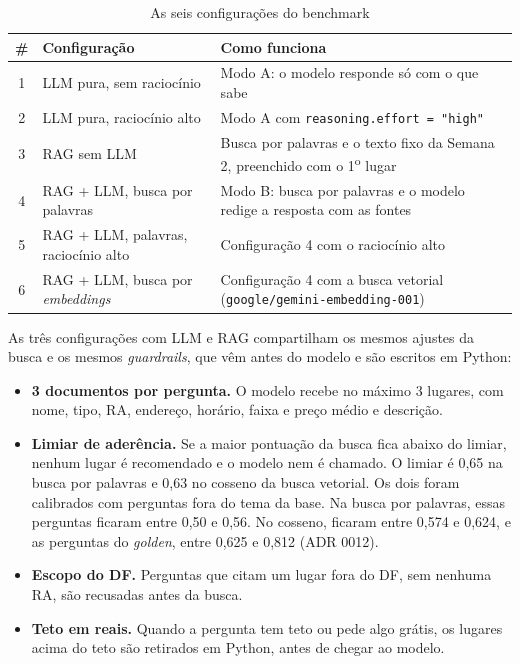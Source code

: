 \documentclass[11pt,a4paper]{article}
\newcommand{\fonte}{\vspace{0.1cm}\flushleft{\footnotesize{Fonte: elaborado pelos autores (2026).}}}
\newcommand{\codigo}[1]{\texttt{\small #1}}
\begin{document}
\begin{table}[!htbp]
\centering
\small
\renewcommand{\arraystretch}{1.03}
\caption{As seis configurações do benchmark}
\label{tab:configs}
\begin{tabularx}{\textwidth}{c p{5.6cm} L}
\toprule
\textbf{\#} & \textbf{Configuração} & \textbf{Como funciona} \\
 & LLM pura, sem raciocínio & Modo A: o modelo responde só com o que sabe \\
2 & LLM pura, raciocínio alto & Modo A com \codigo{reasoning.effort = "high"} \\
3 & RAG sem LLM & Busca por palavras e o texto fixo da Semana 2, preenchido com o 1\textsuperscript{o} lugar \\
4 & RAG + LLM, busca por palavras & Modo B: busca por palavras e o modelo redige a resposta com as fontes \\
5 & RAG + LLM, palavras, raciocínio alto & Configuração 4 com o raciocínio alto \\
6 & RAG + LLM, busca por \textit{embeddings} & Configuração 4 com a busca vetorial (\codigo{google/gemini-embedding-001}) \\
\bottomrule
\end{tabularx}
\fonte
\end{table}

As três configurações com LLM e RAG compartilham os mesmos ajustes da busca e os mesmos \textit{guardrails}, que vêm antes do modelo e são escritos em Python:

\begin{itemize}
\item \textbf{3 documentos por pergunta.} O modelo recebe no máximo 3 lugares, com nome, tipo, RA, endereço, horário, faixa e preço médio e descrição.
\item \textbf{Limiar de aderência.} Se a maior pontuação da busca fica abaixo do limiar, nenhum lugar é recomendado e o modelo nem é chamado. O limiar é 0,65 na busca por palavras e 0,63 no cosseno da busca vetorial. Os dois foram calibrados com perguntas fora do tema da base. Na busca por palavras, essas perguntas ficaram entre 0,50 e 0,56. No cosseno, ficaram entre 0,574 e 0,624, e as perguntas do \textit{golden}, entre 0,625 e 0,812 (ADR 0012).
\item \textbf{Escopo do DF.} Perguntas que citam um lugar fora do DF, sem nenhuma RA, são recusadas antes da busca.
\item \textbf{Teto em reais.} Quando a pergunta tem teto ou pede algo grátis, os lugares acima do teto são retirados em Python, antes de chegar ao modelo.
\end{itemize}
\end{document}
